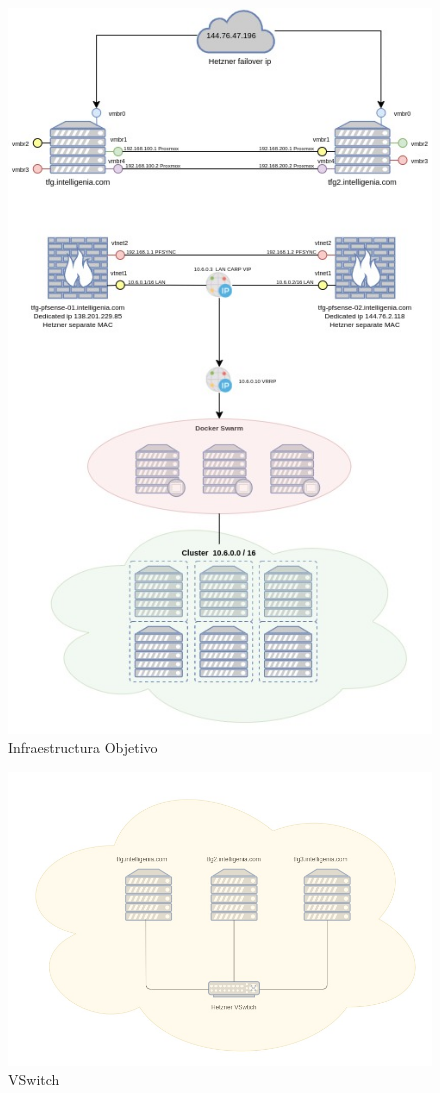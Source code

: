	\begin{figure}[!hbt]
		\label{InfraestructuraObjetivo}
		\centering
		\includegraphics[scale=0.75]{imagenes/Analisis/diagrama.jpg}
		\caption[Infraestructura Objetivo]{Infraestructura Objetivo}
	\end{figure}

	\begin{figure}[!hbt]
		\centering
		\includegraphics[scale=0.4]{imagenes/Analisis/vswitch.jpg}
		\caption[VSwitch]{VSwitch}
		\label{VSwitch}
	\end{figure}





	
	
	